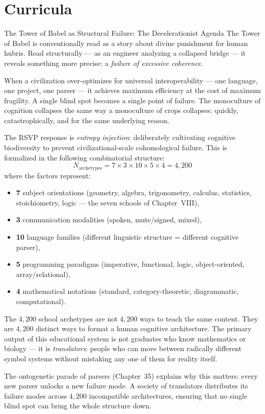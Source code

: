 \section{Curricula}

\begin{conceptaside}{The Tower of Babel as Structural Failure: The Decelerationist Agenda}
  The Tower of Babel is conventionally read as a story about divine
  punishment for human hubris. Read structurally — as an engineer
  analyzing a collapsed bridge — it reveals something more precise:
  a \emph{failure of excessive coherence}.

  When a civilization over-optimizes for universal interoperability —
  one language, one project, one parser — it achieves maximum
  efficiency at the cost of maximum fragility. A single blind spot
  becomes a single point of failure. The monoculture of cognition
  collapses the same way a monoculture of crops collapses: quickly,
  catastrophically, and for the same underlying reason.

  The RSVP response is \emph{entropy injection}: deliberately
  cultivating cognitive biodiversity to prevent civilizational-scale
  cohomological failure. This is formalized in the following
  combinatorial structure:
  \[
    N_\text{archetypes} = 7 \times 3 \times 10 \times 5 \times 4
    = 4{,}200
  \]
  where the factors represent:
  \begin{itemize}
    \item \textbf{7} subject orientations (geometry, algebra, trigonometry,
          calculus, statistics, stoichiometry, logic — the seven schools
          of Chapter~VIII),
    \item \textbf{3} communication modalities (spoken, mute/signed, mixed),
    \item \textbf{10} language families (different linguistic structure
          = different cognitive parser),
    \item \textbf{5} programming paradigms (imperative, functional,
          logic, object-oriented, array/relational),
    \item \textbf{4} mathematical notations (standard, category-theoretic,
          diagrammatic, computational).
  \end{itemize}

  The $4{,}200$ school archetypes are not $4{,}200$ ways to teach the same
  content. They are $4{,}200$ distinct ways to format a human cognitive
  architecture. The primary output of this educational system is not
  graduates who know mathematics or biology — it is \emph{translators}:
  people who can move between radically different symbol systems without
  mistaking any one of them for reality itself.

  The ontogenetic parade of parsers (Chapter~35) explains why this matters:
  every new parser unlocks a new failure mode. A society of translators
  distributes its failure modes across $4{,}200$ incompatible architectures,
  ensuring that no single blind spot can bring the whole structure down.
\end{conceptaside}


